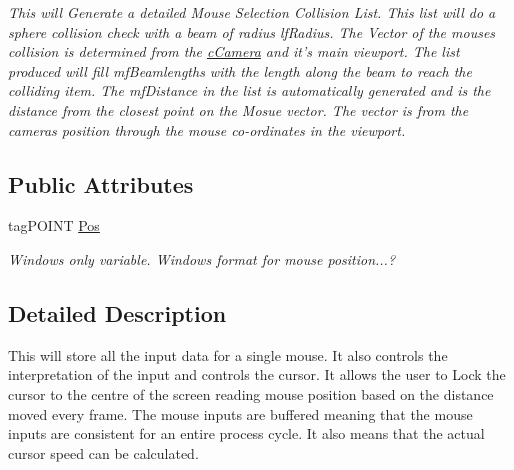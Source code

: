 \begin{DoxyCompactItemize}
\begin{DoxyCompactList}\small\item\em This will Generate a detailed Mouse Selection Collision List. This list will do a sphere collision check with a beam of radius lfRadius. The Vector of the mouses collision is determined from the \hyperlink{classc_camera}{cCamera} and it's main viewport. The list produced will fill mfBeamlengths with the length along the beam to reach the colliding item. The mfDistance in the list is automatically generated and is the distance from the closest point on the Mosue vector. The vector is from the cameras position through the mouse co-\/ordinates in the viewport. \end{DoxyCompactList}\end{DoxyCompactItemize}
\subsection*{Public Attributes}
\begin{DoxyCompactItemize}
\item 
\hypertarget{classc_mouse_ad6306d52aba6df1e6496c038db013442}{
tagPOINT \hyperlink{classc_mouse_ad6306d52aba6df1e6496c038db013442}{Pos}}
\label{classc_mouse_ad6306d52aba6df1e6496c038db013442}

\begin{DoxyCompactList}\small\item\em Windows only variable. Windows format for mouse position...? \end{DoxyCompactList}\end{DoxyCompactItemize}


\subsection{Detailed Description}
This will store all the input data for a single mouse. It also controls the interpretation of the input and controls the cursor. It allows the user to Lock the cursor to the centre of the screen reading mouse position based on the distance moved every frame. The mouse inputs are buffered meaning that the mouse inputs are consistent for an entire process cycle. It also means that the actual cursor speed can be calculated. 